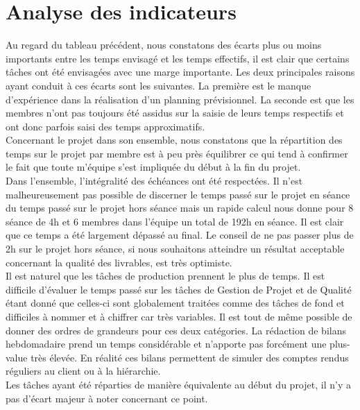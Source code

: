 \section{Analyse des indicateurs}

Au regard du tableau précédent, nous constatons des écarts plus ou moins importants entre les temps envisagé et les temps effectifs, il est clair que certains tâches ont été envisagées avec une marge importante. Les deux principales raisons ayant conduit à ces écarts sont les suivantes. La première est le manque d’expérience dans la réalisation d’un planning prévisionnel. La seconde est que les membres n’ont pas toujours été assidus sur la saisie de leurs temps respectifs et ont donc parfois saisi des temps approximatifs. \\

Concernant le projet dans son ensemble, nous constatons que la répartition des temps sur le projet par membre est à peu près équilibrer ce qui tend à confirmer le fait que toute m’équipe s’est impliquée du début à la fin du projet. \\

Dans l’ensemble, l’intégralité des échéances ont été respectées. Il n’est malheureusement pas possible de discerner le temps passé sur le projet en séance du temps passé sur le projet hors séance mais un rapide calcul nous donne pour 8 séance de 4h et 6 membres dans l’équipe un total de 192h en séance. Il est clair que ce temps a été largement dépassé au final. Le conseil de ne pas passer plus de 2h sur le projet hors séance, si nous souhaitons atteindre un résultat acceptable concernant la qualité des livrables, est très optimiste. \\

Il est naturel que les tâches de production prennent le plus de temps. Il est difficile d’évaluer le temps passé sur les tâches de Gestion de Projet et de Qualité étant donné que celles-ci sont globalement traitées comme des tâches de fond et difficiles à nommer et à chiffrer car très variables. Il est tout de même possible de donner des ordres de grandeurs pour ces deux catégories. La rédaction de bilans hebdomadaire prend un temps considérable et n’apporte pas forcément une plus-value très élevée. En réalité ces bilans permettent de simuler des comptes rendus réguliers au client ou à la hiérarchie. \\

Les tâches ayant été réparties de manière équivalente au début du projet, il n’y a pas d’écart majeur à noter concernant ce point.  \\

